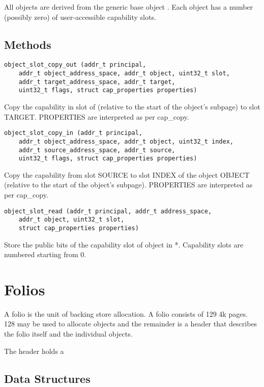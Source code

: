All objects are derived from the generic base object .
Each object has a number (possibly zero) of user-accessible capability
slots.

\subsection{Methods}

\begin{lstlisting}
object_slot_copy_out (addr_t principal,
    addr_t object_address_space, addr_t object, uint32_t slot,
    addr_t target_address_space, addr_t target,
    uint32_t flags, struct cap_properties properties)
\end{lstlisting}

Copy the capability in slot  of  (relative to
the start of the object's subpage) to slot TARGET.  PROPERTIES are
interpreted as per cap\_copy.

\begin{lstlisting}
object_slot_copy_in (addr_t principal,
    addr_t object_address_space, addr_t object, uint32_t index,
    addr_t source_address_space, addr_t source,
    uint32_t flags, struct cap_properties properties)
\end{lstlisting}

Copy the capability from slot SOURCE to slot INDEX of the object
OBJECT (relative to the start of the object's subpage).  PROPERTIES
are interpreted as per cap\_copy.

\begin{lstlisting}
object_slot_read (addr_t principal, addr_t address_space,
    addr_t object, uint32_t slot,
    struct cap_properties properties)
\end{lstlisting}

Store the public bits of the capability slot  of object
 in *.  Capability slots are numbered
starting from 0.

\clearpage
\section{Folios}

A folio is the unit of backing store allocation.  A folio consists of
129 4k pages.  128 may be used to allocate objects and the remainder
is a header that describes the folio itself and the individual
objects.

The header holds a

\subsection{Data Structures}

